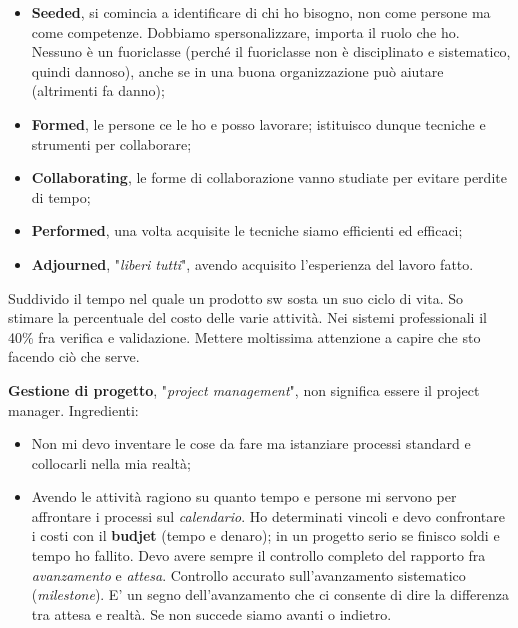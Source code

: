 \begin{itemize}

	\item \textbf{Seeded}, si comincia a identificare di chi ho bisogno, non come persone ma come competenze. Dobbiamo spersonalizzare, importa il ruolo che ho. Nessuno è un fuoriclasse (perché il fuoriclasse non è disciplinato e sistematico, quindi dannoso), anche se in una buona organizzazione può aiutare (altrimenti fa danno);
	
	\item \textbf{Formed}, le persone ce le ho e posso lavorare; istituisco dunque tecniche e strumenti per collaborare;
	
	\item \textbf{Collaborating}, le forme di collaborazione vanno studiate per evitare perdite di tempo;
	
	\item \textbf{Performed}, una volta acquisite le tecniche siamo efficienti ed efficaci;
	
	\item \textbf{Adjourned}, "\textit{liberi tutti}", avendo acquisito l'esperienza del lavoro fatto.

\end{itemize}

Suddivido il tempo nel quale un prodotto sw sosta un suo ciclo di vita. So stimare la percentuale del costo delle varie attività. Nei sistemi professionali il 40\% fra verifica e validazione. Mettere moltissima attenzione a capire che sto facendo ciò che serve.

\textbf{Gestione di progetto}, "\textit{project management}", non significa essere il project manager. Ingredienti:

\begin{itemize}

	\item Non mi devo inventare le cose da fare ma istanziare processi standard e collocarli nella mia realtà;
	
	\item Avendo le attività ragiono su quanto tempo e persone mi servono per affrontare i processi sul \textit{calendario}. Ho determinati vincoli e devo confrontare i costi con il \textbf{budjet} (tempo e denaro); in un progetto serio se finisco soldi e tempo ho fallito. Devo avere sempre il controllo completo del rapporto fra \textit{avanzamento} e \textit{attesa}. Controllo accurato sull'avanzamento sistematico (\textit{milestone}). E' un segno dell'avanzamento che ci consente di dire la differenza tra attesa e realtà. Se non succede siamo avanti o indietro.

\end{itemize}

